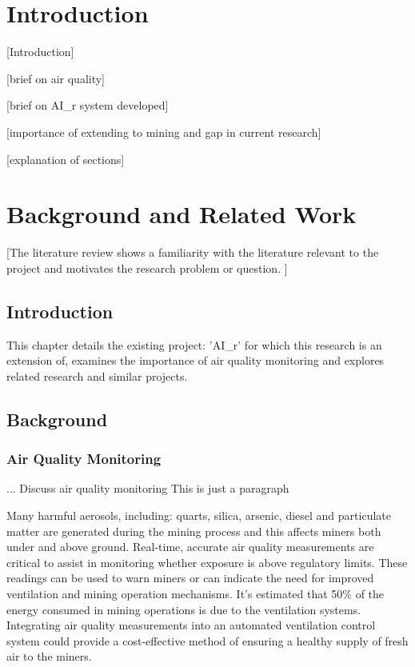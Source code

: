 \documentclass[a4paper,twoside,12pt]{report}
\begin{document}
\tableofcontents
\newpage
{}
{}
\listoffigures
\newpage
{}
{}
\listoftables
\newpage
{}

\chapter{Introduction}
[Introduction]

[brief on air quality]

[brief on AI\_r system developed]

[importance of extending to mining and gap in current research]

[explanation of sections]

\chapter{Background and Related Work}
[The literature review shows a familiarity with
the literature relevant to the project and motivates the research problem or question.
]
\section{Introduction}
This chapter details the existing project: 'AI\_r' for which this research is an extension of, examines the importance of air quality monitoring and explores related research and similar projects.

\section{Background}
\subsection{Air Quality Monitoring}

... Discuss air quality monitoring
This is just a paragraph

Many harmful aerosols, including: quarts, silica, arsenic, diesel and particulate matter are generated during the mining process and this affects miners both under and above ground\citep{Hercus_2022}. Real-time, accurate air quality measurements are critical to assist in monitoring whether exposure is above regulatory limits. These readings can be used to warn miners or can indicate the need for improved ventilation and mining operation mechanisms. It's estimated that 50\% of the energy consumed in mining operations is due to the ventilation systems\citep{Hercus_2022}. Integrating air quality measurements into an automated ventilation control system could provide a cost-effective method of ensuring a healthy supply of fresh air to the miners. 
\end{document}
